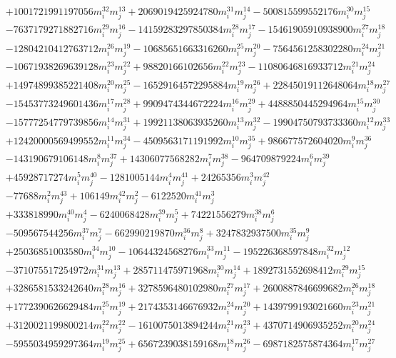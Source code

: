 {\begin{align*}
&+1001721991197056m_i^{32}m_j^{13}+2069019425924780m_i^{31}m_j^{14}-500815599552176m_i^{30}m_j^{15}\\
&-7637179271882716m_i^{29}m_j^{16}-14159283297850384m_i^{28}m_j^{17}-15461905910938900m_i^{27}m_j^{18}\\
&-12804210412763712m_i^{26}m_j^{19}-10685651663316260m_i^{25}m_j^{20}-7564561258302280m_i^{24}m_j^{21}\\
&-10671938269639128m_i^{23}m_j^{22}+98820166102656m_i^{22}m_j^{23}-11080646816933712m_i^{21}m_j^{24}\\
&+14974899385221408m_i^{20}m_j^{25}-16529164572295884m_i^{19}m_j^{26}+22845019112648064m_i^{18}m_j^{27}\\
&-15453773249601436m_i^{17}m_j^{28}+9909474344672224m_i^{16}m_j^{29}+4488850445294964m_i^{15}m_j^{30}\\
&-15777254779739856m_i^{14}m_j^{31}+19921138063935260m_i^{13}m_j^{32}-19904750793733360m_i^{12}m_j^{33}\\
&+12420000569499552m_i^{11}m_j^{34}-4509563171191992m_i^{10}m_j^{35}+986677572604020m_i^{9}m_j^{36}\\
&-143190679106148m_i^{8}m_j^{37}+14306077568282m_i^{7}m_j^{38}-964709879224m_i^{6}m_j^{39}\\
&+45928717274m_i^{5}m_j^{40}-1281005144m_i^{4}m_j^{41}+24265356m_i^{3}m_j^{42}\\
&-77688m_i^{2}m_j^{43}+106149m_i^{42}m_j^{2}-6122520m_i^{41}m_j^{3}\\
&+333818990m_i^{40}m_j^{4}-6240068428m_i^{39}m_j^{5}+74221556279m_i^{38}m_j^{6}\\
&-509567544256m_i^{37}m_j^{7}-662990219870m_i^{36}m_j^{8}+3247832937500m_i^{35}m_j^{9}\\
&+25036851003580m_i^{34}m_j^{10}-10644324568276m_i^{33}m_j^{11}-195226368597848m_i^{32}m_j^{12}\\
&-371075517254972m_i^{31}m_j^{13}+285711475971968m_i^{30}m_j^{14}+1892731552698412m_i^{29}m_j^{15}\\
&+3286581533242640m_i^{28}m_j^{16}+3278596480102980m_i^{27}m_j^{17}+2600887846699682m_i^{26}m_j^{18}\\
&+1772390626629484m_i^{25}m_j^{19}+2174353146676932m_i^{24}m_j^{20}+1439799193021660m_i^{23}m_j^{21}\\
&+3120021199800214m_i^{22}m_j^{22}-1610075013894244m_i^{21}m_j^{23}+4370714906935252m_i^{20}m_j^{24}\\
&-5955034959297364m_i^{19}m_j^{25}+6567239038159168m_i^{18}m_j^{26}-6987182575874364m_i^{17}m_j^{27}\\

\end{align*}}
